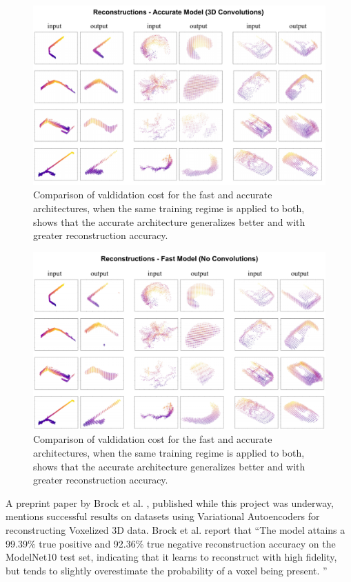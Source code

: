 \begin{figure}
  \centering
  \includegraphics[width=5.2in]{images/convreconstructions.pdf}
  \caption{Comparison of valdidation cost for the fast and accurate architectures, when the same training regime is applied to both, shows that the accurate architecture generalizes better and with greater reconstruction accuracy.}
  \label{fig:trainingcost}
\end{figure}

\begin{figure}
  \centering
  \includegraphics[width=5.2in]{images/noconvreconstructions.pdf}
  \caption{Comparison of valdidation cost for the fast and accurate architectures, when the same training regime is applied to both, shows that the accurate architecture generalizes better and with greater reconstruction accuracy.}
  \label{fig:trainingcost}
\end{figure}

A preprint paper by Brock et al.  \cite{voxel-autoencoder}, published while this project was underway,  mentions successful results on datasets using Variational Autoencoders for reconstructing Voxelized 3D data.
Brock et al. \cite{voxel-autoencoder} report that ``The model attains a 99.39\% true positive and 92.36\% true negative reconstruction accuracy on the ModelNet10 test set, indicating that it learns to reconstruct with high fidelity, but tends to slightly overestimate the probability of a voxel being present. ''\\

